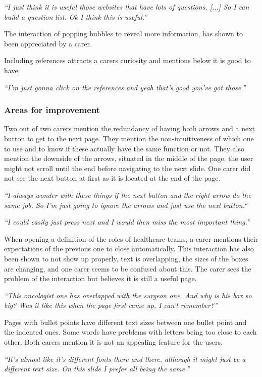 \documentclass{sigchi}
\begin{document}
\textit{“I just think it is useful those websites that have lots of questions. [...] So I can build a question list. Ok I think this is useful.”} 

The interaction of popping bubbles to reveal more information, has shown to been appreciated by a carer.

Including references attracts a carers curiosity and mentions below it is good to have.

\textit{“I’m just gonna click on the references and yeah that’s good you’ve got those.”}

\subsubsection{Areas for improvement}
Two out of two carers mention the redundancy of having both arrows and a next button to get to the next page. They mention the non-intuitiveness of which one to use and to know if these actually have the same function or not. They also mention the downside of the arrows, situated in the middle of the page, the user might not scroll until the end before navigating to the next slide. One carer did not see the next button at first as it is located at the end of the page.

\textit{“I always wonder with these things if the next button and the right arrow do the same job. So I’m just going to ignore the arrows and just use the next button.“}

\textit{“I could easily just press next and I would then miss the most important thing.”}

When opening a definition of the roles of healthcare teams, a carer mentions their expectations of the previous one to close automatically. This interaction has also been shown to not show up properly, text is overlapping, the sizes of the boxes are changing, and one carer seems to be confused about this. The carer sees the problem of the interaction but believes it is still a useful page.

\textit{“This oncologist one has overlapped with the surgeon one. And why is his box so big? Was it like this when the page first came up, I can’t remember?”}

Pages with bullet points have different text sizes between one bullet point and the indented ones. Some words have problems with letters being too close to each other. Both carers mention it is not an appealing feature for the users.

\textit{“It’s almost like it’s different fonts there and there, although it might just be a different text size. On this slide I prefer all being the same.”}
\end{document}
